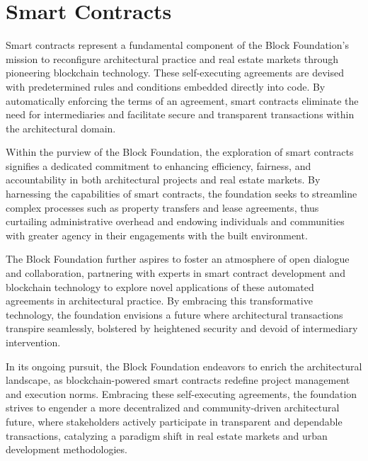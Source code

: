 \section{Smart Contracts}

Smart contracts represent a fundamental component of the Block Foundation's mission to reconfigure architectural practice and real estate markets through pioneering blockchain technology. These self-executing agreements are devised with predetermined rules and conditions embedded directly into code. By automatically enforcing the terms of an agreement, smart contracts eliminate the need for intermediaries and facilitate secure and transparent transactions within the architectural domain.

Within the purview of the Block Foundation, the exploration of smart contracts signifies a dedicated commitment to enhancing efficiency, fairness, and accountability in both architectural projects and real estate markets. By harnessing the capabilities of smart contracts, the foundation seeks to streamline complex processes such as property transfers and lease agreements, thus curtailing administrative overhead and endowing individuals and communities with greater agency in their engagements with the built environment.

The Block Foundation further aspires to foster an atmosphere of open dialogue and collaboration, partnering with experts in smart contract development and blockchain technology to explore novel applications of these automated agreements in architectural practice. By embracing this transformative technology, the foundation envisions a future where architectural transactions transpire seamlessly, bolstered by heightened security and devoid of intermediary intervention.

In its ongoing pursuit, the Block Foundation endeavors to enrich the architectural landscape, as blockchain-powered smart contracts redefine project management and execution norms. Embracing these self-executing agreements, the foundation strives to engender a more decentralized and community-driven architectural future, where stakeholders actively participate in transparent and dependable transactions, catalyzing a paradigm shift in real estate markets and urban development methodologies.